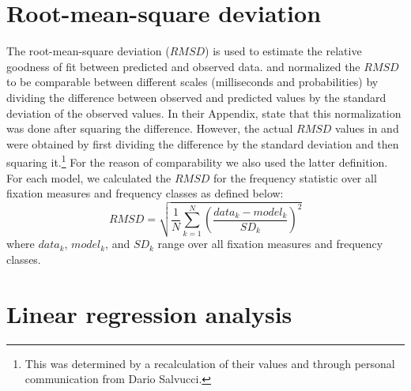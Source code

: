\documentclass{cambridge7A}\usepackage[]{graphicx}\usepackage[]{color}
\begin{document}
\newpage
\begin{subappendices}


\section{Root-mean-square deviation}
The  root-mean-square deviation ($RMSD$) is used to estimate the relative goodness of fit between predicted and observed data.
\cite{Reichle1998} and \cite{Salvucci2001} normalized the $RMSD$ to be comparable between different scales (milliseconds and probabilities) by dividing the difference between observed and predicted values by the standard deviation of the observed values.   In their Appendix, \cite{Reichle1998} state that this normalization was done after squaring the difference.  However, the actual $RMSD$ values in \cite{Reichle1998} and \cite{Salvucci2001} were obtained by first dividing the difference by the standard deviation and then squaring it.\footnote{This was determined by a recalculation of their values and through personal communication from Dario Salvucci.}  For the reason of comparability we also used the latter definition. 
For each model, we calculated the $RMSD$ for the frequency statistic over all fixation measures and frequency classes as defined below:  
\begin{equation}
RMSD = \sqrt{\frac{1}{N}\sum_{k=1}^N\left(\frac{data_{k}-model_{k}}{SD_{k}}\right)^2}
\end{equation}
where $data_k$, $model_k$, and $SD_k$ range over all fixation measures and frequency classes. 

\section{Linear regression analysis}
 

\end{subappendices}
\end{document}

